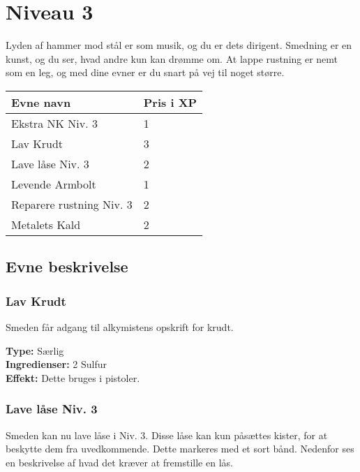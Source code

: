 \chapter{Niveau 3}
Lyden af hammer mod stål er som musik, og du er dets dirigent. Smedning er en kunst, og du ser, hvad andre kun kan drømme om. At lappe rustning er nemt som en leg, og med dine evner er du snart på vej til noget større.

\begin{table}[H]
    \centering
    \begin{tabular}{|p{}|p{}|}
    \rowcolor{cerulean!80}\hline
        Evne navn & Pris i XP \\\hline
        Ekstra NK Niv. 3 & 1 \\\hline
        Lav Krudt & 3 \\\hline
        Lave låse Niv. 3 & 2 \\\hline
        Levende Armbolt & 1 \\\hline
        Reparere rustning Niv. 3 & 2\\\hline
        Metalets Kald & 2\\\hline
    \end{tabular}
\end{table}
\section{Evne beskrivelse}



\subsection{Lav Krudt}
Smeden får adgang til alkymistens opskrift for krudt.
\begin{særlig*}[Krudt]
    \textbf{Type:} Særlig\\
    \textbf{Ingredienser:} 2 Sulfur\\
    \textbf{Effekt:} Dette bruges i pistoler.\\
\end{særlig*}

\subsection{Lave låse Niv. 3}
Smeden kan nu lave låse i Niv. 3. Disse låse kan kun påsættes kister, for at beskytte dem fra uvedkommende. Dette markeres med et sort bånd. Nedenfor ses en beskrivelse af hvad det kræver at fremstille en lås.\\

